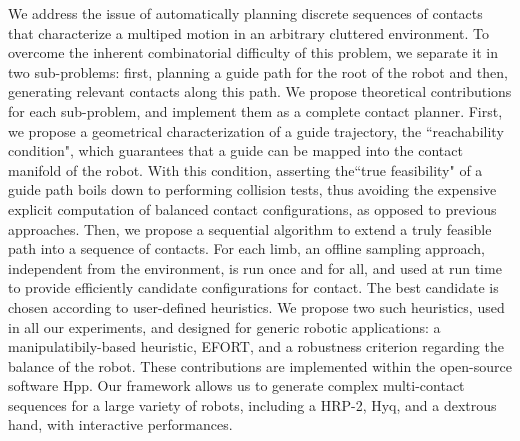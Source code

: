 We address the issue of automatically planning discrete sequences of contacts
that characterize a multiped motion in an arbitrary cluttered environment.
To overcome the inherent combinatorial difficulty of this problem, we separate it
in two sub-problems: first, planning a guide path for the root of the robot and
then, generating relevant contacts along this path.
We propose theoretical contributions for each sub-problem, and implement them
as a complete contact planner. 
First, we propose a geometrical characterization of a guide trajectory, the ``reachability condition", which guarantees that a
guide can be mapped into the contact manifold of the robot. With this condition, asserting the``true feasibility" 
of a guide path boils down to performing collision tests, thus avoiding the expensive explicit computation of balanced contact configurations, as opposed to previous approaches.
Then, we propose a sequential algorithm to extend a truly feasible path into a sequence of contacts. For each limb, an offline sampling approach,
independent from the environment, is run once and for all, and used at run time to provide efficiently candidate configurations for contact.
The best candidate is chosen according to user-defined heuristics. We propose two such heuristics, used in all our experiments, and 
designed for generic robotic applications: a manipulatibily-based heuristic, EFORT, and a robustness criterion regarding the balance of the robot.
These contributions are implemented within the open-source software Hpp. Our framework allows us to generate complex multi-contact sequences for a large
variety of robots, including a HRP-2, Hyq, and a dextrous hand, with interactive performances.

